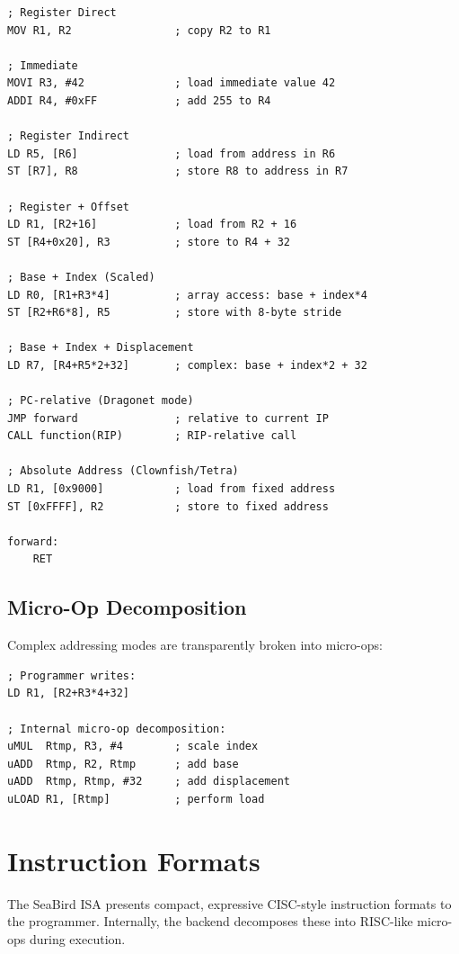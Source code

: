 \documentclass[12pt]{article}
\begin{document}
\begin{lstlisting}
; Register Direct
MOV R1, R2                ; copy R2 to R1

; Immediate
MOVI R3, #42              ; load immediate value 42
ADDI R4, #0xFF            ; add 255 to R4

; Register Indirect
LD R5, [R6]               ; load from address in R6
ST [R7], R8               ; store R8 to address in R7

; Register + Offset
LD R1, [R2+16]            ; load from R2 + 16
ST [R4+0x20], R3          ; store to R4 + 32

; Base + Index (Scaled)
LD R0, [R1+R3*4]          ; array access: base + index*4
ST [R2+R6*8], R5          ; store with 8-byte stride

; Base + Index + Displacement
LD R7, [R4+R5*2+32]       ; complex: base + index*2 + 32

; PC-relative (Dragonet mode)
JMP forward               ; relative to current IP
CALL function(RIP)        ; RIP-relative call

; Absolute Address (Clownfish/Tetra)
LD R1, [0x9000]           ; load from fixed address
ST [0xFFFF], R2           ; store to fixed address

forward:
    RET
\end{lstlisting}

\subsection{Micro-Op Decomposition}

Complex addressing modes are transparently broken into micro-ops:

\begin{lstlisting}
; Programmer writes:
LD R1, [R2+R3*4+32]

; Internal micro-op decomposition:
uMUL  Rtmp, R3, #4        ; scale index
uADD  Rtmp, R2, Rtmp      ; add base
uADD  Rtmp, Rtmp, #32     ; add displacement
uLOAD R1, [Rtmp]          ; perform load
\end{lstlisting}

\section{Instruction Formats}

The SeaBird ISA presents compact, expressive CISC-style instruction formats to the programmer. Internally, the backend decomposes these into RISC-like micro-ops during execution.
\end{document}
